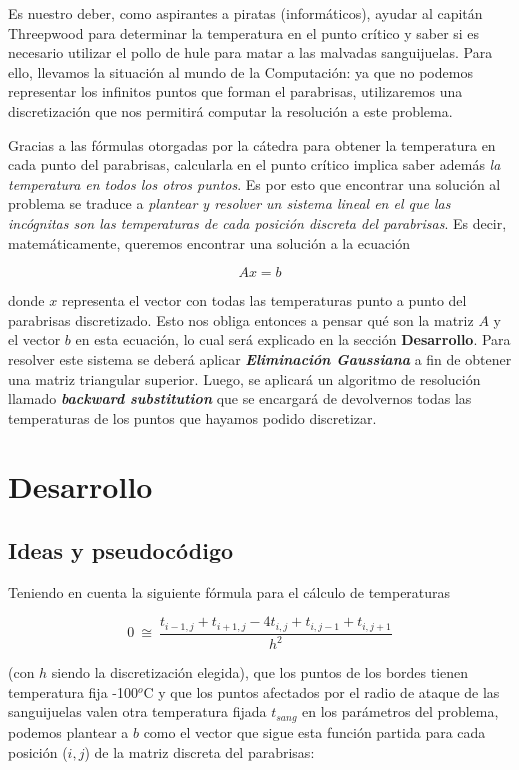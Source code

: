 \vspace{\baselineskip}
\par 
Es nuestro deber, como aspirantes a piratas (informáticos), ayudar al capitán Threepwood para determinar la temperatura en el punto crítico y saber si es necesario utilizar el pollo de hule para matar a las malvadas sanguijuelas. Para ello, llevamos la situación al mundo de la Computación: ya que no podemos representar los infinitos puntos que forman el parabrisas, utilizaremos una discretización que nos permitirá computar la resolución a este problema. 
\par
Gracias a las fórmulas otorgadas por la cátedra para obtener la temperatura en cada punto del parabrisas, calcularla en el punto crítico implica saber además \textit{la temperatura en todos los otros puntos}. Es por esto que encontrar una solución al problema se traduce a \textit{plantear y resolver un sistema lineal en el que las incógnitas son las temperaturas de cada posición discreta del parabrisas}. Es decir, matemáticamente, queremos encontrar una solución a la ecuación

\[ Ax = b \]

donde $x$ representa el vector con todas las temperaturas punto a punto del parabrisas discretizado. Esto nos obliga entonces a pensar qué son la matriz $A$ y el vector $b$ en esta ecuación, lo cual será explicado en la sección \textbf{Desarrollo}. Para resolver este sistema se deberá aplicar \textbf{\textit{Eliminación Gaussiana}} a fin de obtener una matriz triangular superior. Luego, se aplicará un algoritmo de resolución llamado \textbf{\textit{backward substitution}} que se encargará de devolvernos todas las temperaturas de los puntos que hayamos podido discretizar.

\section{Desarrollo}


\subsection{Ideas y pseudocódigo}

 Teniendo en cuenta la siguiente fórmula para el cálculo de temperaturas

\[
0 \ \cong\ \frac{ t_{i-1,j} + t_{i+1,j} - 4t_{i,j} + t_{i,j-1} + t_{i,j+1}}{h^2}
\]

(con $h$ siendo la discretización elegida), que los puntos de los bordes tienen temperatura fija -100${}^o$C y que los puntos afectados por el radio de ataque de las sanguijuelas valen otra temperatura fijada $t_{sang}$ en los parámetros del problema, podemos plantear a $b$ como el vector que sigue esta función partida para cada posición ($i,j$) de la matriz discreta del parabrisas:


